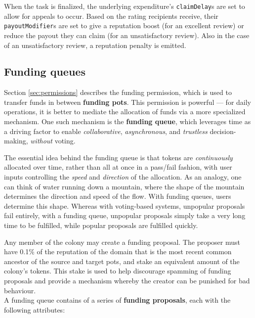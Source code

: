 When the task is finalized, the underlying expenditure's \texttt{claimDelay}s are set to allow for appeals to occur. Based on the rating recipients receive, their \texttt{payoutModifier}s are set to give a reputation boost (for an excellent review) or reduce the payout they can claim (for an unsatisfactory review). Also in the case of an unsatisfactory review, a reputation penalty is emitted.

\subsection{Funding queues}\label{sec:funding-queues}

Section \ref{sec:permissions} describes the funding permission, which is used to transfer funds in between \textbf{funding pots}. This permission is powerful --- for daily operations, it is better to mediate the allocation of funds via a more specialized mechanism. One such mechanism is the \textbf{funding queue}, which leverages time as a driving factor to enable \textit{collaborative}, \textit{asynchronous}, and \textit{trustless} decision-making, \textit{without} voting.

The essential idea behind the funding queue is that tokens are \textit{continuously} allocated over time, rather than all at once in a pass/fail fashion, with user inputs controlling the \textit{speed} and \textit{direction} of the allocation. As an analogy, one can think of water running down a mountain, where the shape of the mountain determines the direction and speed of the flow. With funding queues, users determine this shape. Whereas with voting-based systems, unpopular proposals fail entirely, with a funding queue, unpopular proposals simply take a very long time to be fulfilled, while popular proposals are fulfilled quickly.

Any member of the colony may create a funding proposal. The proposer must have 0.1\% of the reputation of the domain that is the most recent common ancestor of the source and target pots, and stake an equivalent amount of the colony's tokens. This stake is used to help discourage spamming of funding proposals and provide a mechanism whereby the creator can be punished for bad behaviour. \\

A funding queue contains of a series of \textbf{funding proposals}, each with the following attributes:

